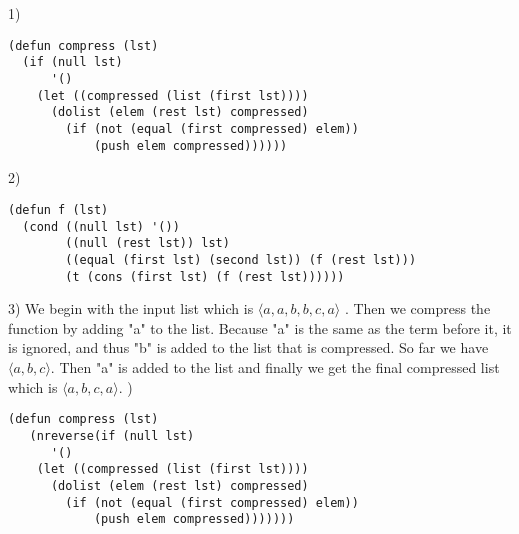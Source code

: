 \documentclass{article}
\begin{document}
\section{}
1)\newline\newline
\begin{verbatim}
(defun compress (lst)
  (if (null lst)
      '()
    (let ((compressed (list (first lst))))
      (dolist (elem (rest lst) compressed)
        (if (not (equal (first compressed) elem))
            (push elem compressed))))))

\end{verbatim}
2)\newline\newline
\begin{verbatim}
(defun f (lst)
  (cond ((null lst) '())
        ((null (rest lst)) lst)
        ((equal (first lst) (second lst)) (f (rest lst)))
        (t (cons (first lst) (f (rest lst)))))) 
\end{verbatim}
3)\newline\newline
We begin with the input list which is $\langle a, a, b, b, c, a \rangle$ . Then we compress the function by adding "a" to the list. Because "a" is the same as the term before it, it is ignored, and thus "b" is added to the list that is compressed. So far we have $\langle a, b, c \rangle$. Then "a" is added to the list and finally we get the final compressed list which is $\langle a, b, c, a \rangle$.
\newline{})\newline\newline
\begin{verbatim}
(defun compress (lst)
   (nreverse(if (null lst)
      '()
    (let ((compressed (list (first lst))))
      (dolist (elem (rest lst) compressed)
        (if (not (equal (first compressed) elem))
            (push elem compressed)))))))
\end{verbatim}
\end{document}
